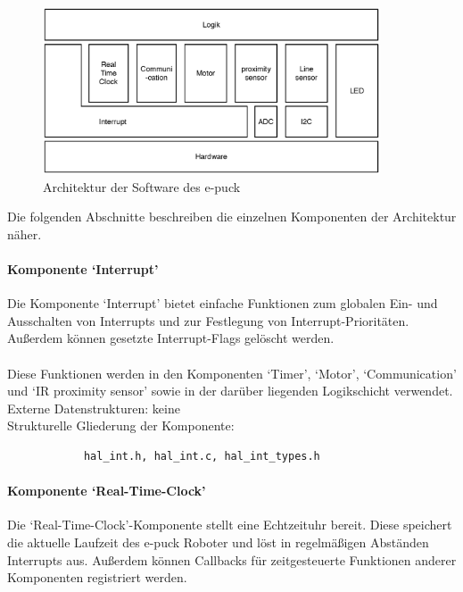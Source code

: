 \documentclass[10pt,a4paper]{article}
\begin{document}
		\begin{figure}[h]
			\centering
			\includegraphics[width=10cm]{images/e-puck_architecture.eps}
  			\caption{Architektur der Software des e-puck}
  		\end{figure}
		
		Die folgenden Abschnitte beschreiben die einzelnen Komponenten der Architektur näher.
		 
			\paragraph*{Komponente `Interrupt'}
			Die Komponente `Interrupt' bietet einfache Funktionen zum globalen Ein- und Ausschalten von Interrupts und zur Festlegung
			von Interrupt-Prioritäten. Außerdem können gesetzte Interrupt-Flags gelöscht werden. \\ \\
			Diese Funktionen werden in den Komponenten `Timer', `Motor', `Communication' und `IR proximity sensor' sowie
			in der darüber liegenden Logikschicht verwendet. \\
			
			Externe Datenstrukturen: keine \\
			
			Strukturelle Gliederung der Komponente:
			\begin{verbatim}  
			hal_int.h, hal_int.c, hal_int_types.h
			\end{verbatim}

			\paragraph*{Komponente `Real-Time-Clock'}
			Die `Real-Time-Clock'-Komponente stellt eine Echtzeituhr bereit. Diese speichert die aktuelle Laufzeit des e-puck Roboter und löst in
			regelmäßigen Abständen Interrupts aus.
			Außerdem können Callbacks für zeitgesteuerte Funktionen anderer Komponenten registriert werden. \\
			
\end{document}
